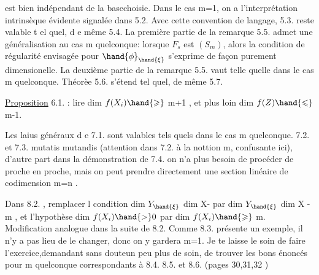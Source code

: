 
est bien indépendant de la base\hand{/}choisie.  Dans le cas  m=1, on a
l'interprétation intrinsèque évidente signalée dans 5.2.  Avec cette
convention de langage, 5.3.  reste valable t el quel, d e même 5.4.
La première partie de la remarque 5.5.   admet une  
généralisation au
 cas m quelconque:  lorsque $F_s$  est  $(S_m)$, alors la condition de
régularité envisagée pour $\hand{\phi}_{\hand{\xi}}$  s'exprime de façon purement dimensionelle.
La deuxième partie de la remarque 5.5. vaut telle quelle dans le cas
m quelconque.      Théorèe 5.6.  s'étend tel quel,  de même 5.7.

\uline{Proposition} 6.1.  :  lire   dim $f(X_i) \hand{\geqslant}$  m+1 ,  et
plus loin   dim $f(Z) \hand{\leqslant}$ m-1.

Les laius généraux d e 7.1. sont valables tels quels dans le cas
m quelconque.  7.2. et 7.3.  mutatis mutandis (attention dans 7.2.
à la nottion m, confusante ici),  d'autre part dans la démonstration
de 7.4. on n'a plus besoin de procéder de proche en proche, mais on
peut prendre directement une section linéaire  de codimension m=n .

Dans 8.2. , remplacer l condition    dim $Y_{\hand{\xi}}$ \hand{$>$} dim X-
par  dim $Y_{\hand{\xi}}$ \hand{$>$}  dim X  - m , et l'hypothèse  dim $f(X_i) \hand{>} 0$  par
dim $f(X_i) \hand{\geqslant}$ m.   Modification analogue dans la suite de 8.2.  Comme
8.3.  présente un exemple, il n'y a pas lieu de le changer, donc on
y gardera m=1.   Je te laisse le soin de faire l'exercice,demandant
sans doute\hand{/}un peu plus de soin, de trouver  les bons énoncés pour m
quelconque correspondants à  8.4.  8.5.  et 8.6.   (pages 30,31,32 )\hand{;}


